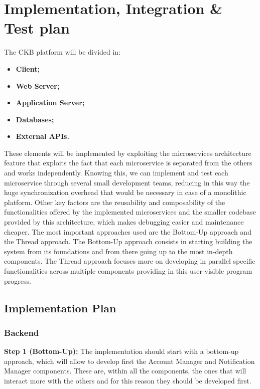 \documentclass{article}
\begin{document}
{\section{Implementation, Integration \& Test plan}
    The CKB platform will be divided in:
    \begin{itemize}
        \item \textbf{Client;}
        \item \textbf{Web Server;}
        \item \textbf{Application Server;}
        \item \textbf{Databases;}
        \item \textbf{External APIs.}
    \end{itemize}
    These elements will be implemented by exploiting the microservices architecture feature that 
    exploits the fact that each microservice is separated from the others and works independently.
    Knowing this, we can implement and test each microservice through several small 
    development teams, reducing in this way the huge synchronization overhead that would be
    necessary in case of a monolithic platform. 
    Other key factors are the reusability and composability of the functionalities offered by the
    implemented microservices and the smaller codebase provided by this architecture, which makes
    debugging easier and maintenance cheaper.
    The most important approaches used are the Bottom-Up approach and the Thread approach.
    The Bottom-Up approach consists in starting building the system from its foundations and
    from there going up to the most in-depth components.
    The Thread approach focuses more on developing in parallel specific 
    functionalities across multiple components providing in this user-visible program progress.

    \subsection{Implementation Plan}
        \subsubsection{Backend}
        \textbf{Step 1 (Bottom-Up):} The implementation should start with a bottom-up approach, which
        will allow to develop first the Account Manager and Notification Manager components.
        These are, within all the components, the ones that will interact more with the others and
        for this reason they should be developed first.
        
}
\end{document}
